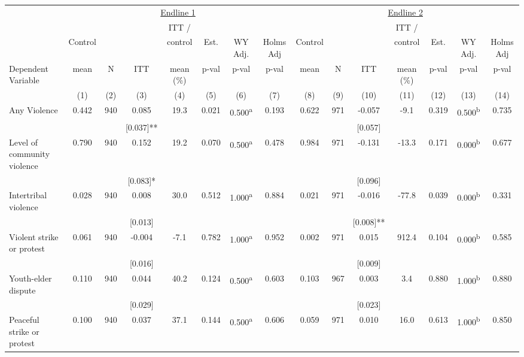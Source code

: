 \begin{tabular}{lcccccccccccccc}
\hline \noalign{\smallskip} & \multicolumn{7}{c}{\uline{\hfill Endline 1 \hfill}} & \multicolumn{7}{c}{\uline{\hfill Endline 2 \hfill}}\\
 &  &  &  & ITT / &  &  &  &  &  &  & ITT / &  &  & \\
 & Control &  &  & control & Est. & WY Adj. & Holms Adj & Control &  &  & control & Est. & WY Adj. & Holms Adj\\
Dependent Variable & mean & N & ITT & mean (\%) & p-val & p-val & p-val & mean & N & ITT & mean (\%) & p-val & p-val & p-val\\
 & (1) & (2) & (3) & (4) & (5) & (6) & (7) & (8) & (9) & (10) & (11) & (12) & (13) & (14)\\
\noalign{\smallskip}\hline \noalign{\smallskip}Any Violence & 0.442 & 940 & 0.085 & 19.3 & 0.021 & 0.500\textsuperscript{a} & 0.193 & 0.622 & 971 & -0.057 & -9.1 & 0.319 & 0.500\textsuperscript{b} & 0.735\\
 &  &  & [0.037]** &  &  &  &  &  &  & [0.057] &  &  &  & \\
Level of community violence & 0.790 & 940 & 0.152 & 19.2 & 0.070 & 0.500\textsuperscript{a} & 0.478 & 0.984 & 971 & -0.131 & -13.3 & 0.171 & 0.000\textsuperscript{b} & 0.677\\
 &  &  & [0.083]* &  &  &  &  &  &  & [0.096] &  &  &  & \\
\quad Intertribal violence & 0.028 & 940 & 0.008 & 30.0 & 0.512 & 1.000\textsuperscript{a} & 0.884 & 0.021 & 971 & -0.016 & -77.8 & 0.039 & 0.000\textsuperscript{b} & 0.331\\
 &  &  & [0.013] &  &  &  &  &  &  & [0.008]** &  &  &  & \\
\quad Violent strike or protest & 0.061 & 940 & -0.004 & -7.1 & 0.782 & 1.000\textsuperscript{a} & 0.952 & 0.002 & 971 & 0.015 & 912.4 & 0.104 & 0.000\textsuperscript{b} & 0.585\\
 &  &  & [0.016] &  &  &  &  &  &  & [0.009] &  &  &  & \\
\quad Youth-elder dispute & 0.110 & 940 & 0.044 & 40.2 & 0.124 & 0.500\textsuperscript{a} & 0.603 & 0.103 & 967 & 0.003 & 3.4 & 0.880 & 1.000\textsuperscript{b} & 0.880\\
 &  &  & [0.029] &  &  &  &  &  &  & [0.023] &  &  &  & \\
\quad Peaceful strike or protest & 0.100 & 940 & 0.037 & 37.1 & 0.144 & 0.500\textsuperscript{a} & 0.606 & 0.059 & 971 & 0.010 & 16.0 & 0.613 & 1.000\textsuperscript{b} & 0.850\\

\end{tabular}

